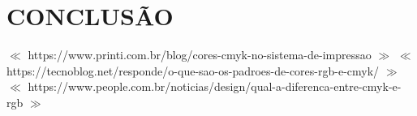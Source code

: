 \documentclass[12pt,a4paper,oneside]{abntex2}
\begin{document}
 \chapter{CONCLUSÃO}
	
	\begin{thebibliography}{1}
              $\ll$ https://www.printi.com.br/blog/cores-cmyk-no-sistema-de-impressao $\gg$
              $\ll$ https://tecnoblog.net/responde/o-que-sao-os-padroes-de-cores-rgb-e-cmyk/ $\gg$
             $\ll$ https://www.people.com.br/noticias/design/qual-a-diferenca-entre-cmyk-e-rgb $\gg$
	\end{thebibliography}
\end{document}
